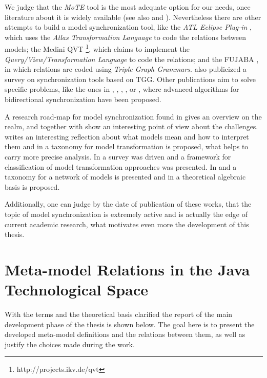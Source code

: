 \documentclass[tuberlin,cic,tc,english,noabntcite]{iiufrgs}
\begin{document}
We judge that the \emph{MoTE} tool is the most adequate option for our needs, once literature about it is widely available (see also \citep{giese2009efficient} and \citep{hildebrandt2012mdelab}). Nevertheless there are other attempts to build a model synchronization tool, like the \emph{ATL Eclipse Plug-in} \citep{jouault2008atl}, which uses the \emph{Atlas Transformation Language} to code the relations between models; the Medini QVT \footnote{http://projects.ikv.de/qvt}, which claims to implement the \emph{Query/View/Transformation Language} to code the relations; and the FUJABA \citep{nickel2000fujaba}, in which relations are coded using \emph{Triple Graph Grammars}. \citet{hildebrandt2013survey} also publicized a survey on synchronization tools based on TGG. Other publications aim to solve specific problems, like the ones in \citet{hermann2011correctness}, \citet{xiong2007towards}, \citet{giese2006incremental}, \citet{ivkovic2004tracing}, or \citet{song2011instant}, where advanced algorithms for bidirectional synchronization have been proposed.

A research road-map for model synchronization found in \citet{france2007model} gives an overview on the realm, and together with \citet{mattsson2009linking} show an interesting point of view about the challenges. \citet{seidewitz2003models} writes an interesting reflection  about what models mean and how to interpret them and in \citet{mens2006taxonomy} a taxonomy for model transformation is proposed, what helps to carry more precise analysis. In \citet{czarnecki2006feature} a survey was driven and a framework for classification of model transformation approaches was presented. In \citeauthor{diskin2014towards} \citeyearpar{diskin2014towards} and \citeyearpar{diskin2016three} a taxonomy for a network of models is presented and in \citet{diskin2011model} a theoretical algebraic basis is proposed.

Additionally, one can judge by the date of publication of these works, that the topic of model synchronization is extremely active and is actually the edge of current academic research, what motivates even more the development of this thesis.

\chapter{Meta-model Relations in the Java Technological Space}
\label{chapter:metamodel_relations}
With the terms and the theoretical basis clarified the report of the main development phase of the thesis is shown below. The goal here is to present the developed meta-model definitions and the relations between them, as well as justify the choices made during the work.
\end{document}
